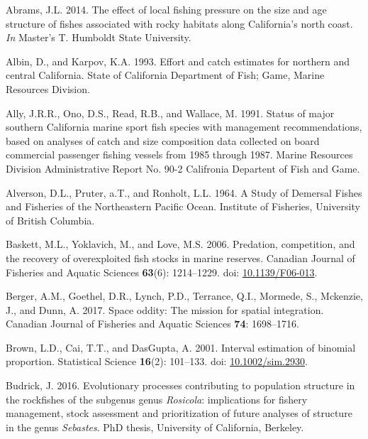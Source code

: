 \documentclass[
  english,
  a4paper,
]{article}
\newlength{\cslhangindent}
\newlength{\cslentryspacingunit} %
\newenvironment{CSLReferences}[2] %
 {%
  \setlength{\parindent}{0pt}
  \ifodd #1
  \let\oldpar\par
  \def\par{\hangindent=\cslhangindent\oldpar}
  \fi
  \setlength{\parskip}{#2\cslentryspacingunit}
 }%
 {}
\begin{document}
\hypertarget{refs}{}
\begin{CSLReferences}{1}{0}
\leavevmode{}%
Abrams, J.L. 2014. {The effect of local fishing pressure on the size and age structure of fishes associated with rocky habitats along California's north coast}. \emph{In} Master's T. Humboldt State University.

\leavevmode{}%
Albin, D., and Karpov, K.A. 1993. {Effort and catch estimates for northern and central California}. State of California Department of Fish; Game, Marine Resources Division.

\leavevmode{}%
Ally, J.R.R., Ono, D.S., Read, R.B., and Wallace, M. 1991. {Status of major southern California marine sport fish species with management recommendations, based on analyses of catch and size composition data collected on board commercial passenger fishing vessels from 1985 through 1987}. Marine Resources Division Administrative Report No. 90-2 Califronia Departent of Fish and Game.

\leavevmode{}%
Alverson, D.L., Pruter, a.T., and Ronholt, L.L. 1964. {A Study of Demersal Fishes and Fisheries of the Northeastern Pacific Ocean}. Institute of Fisheries, University of British Columbia.

\leavevmode{}%
Baskett, M.L., Yoklavich, M., and Love, M.S. 2006. {Predation, competition, and the recovery of overexploited fish stocks in marine reserves}. Canadian Journal of Fisheries and Aquatic Sciences \textbf{63}(6): 1214--1229. doi: \href{https://doi.org/10.1139/F06-013}{10.1139/F06-013}.

\leavevmode{}%
Berger, A.M., Goethel, D.R., Lynch, P.D., Terrance, Q.I., Mormede, S., Mckenzie, J., and Dunn, A. 2017. {Space oddity: The mission for spatial integration}. Canadian Journal of Fisheries and Aquatic Sciences \textbf{74}: 1698--1716.

\leavevmode{}%
Brown, L.D., Cai, T.T., and DasGupta, A. 2001. {Interval estimation of binomial proportion}. Statistical Science \textbf{16}(2): 101--133. doi: \href{https://doi.org/10.1002/sim.2930}{10.1002/sim.2930}.

\leavevmode{}%
Budrick, J. 2016. {Evolutionary processes contributing to population structure in the rockfishes of the subgenus genus \emph{Rosicola}: implications for fishery management, stock assessment and prioritization of future analyses of structure in the genus \emph{Sebastes}.} PhD thesis, University of California, Berkeley.


\end{CSLReferences}
\end{document}
